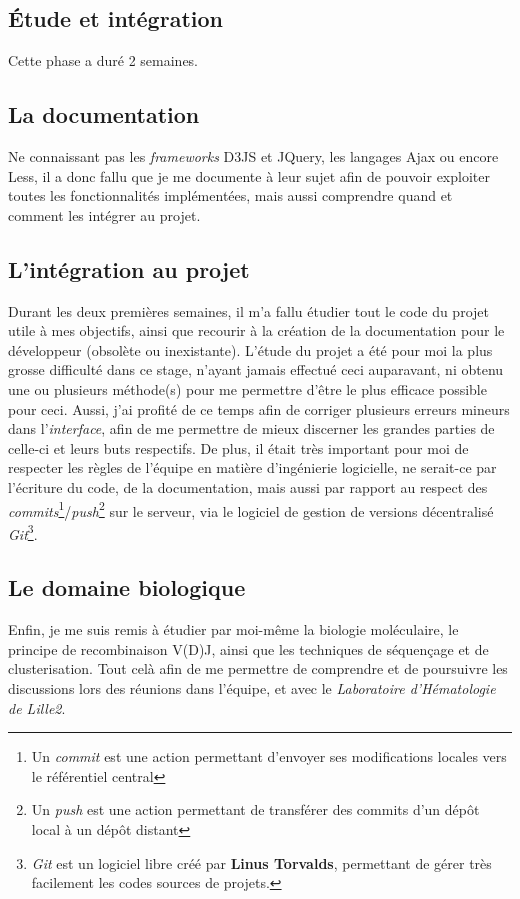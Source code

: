 \documentclass[pdftex,12pt,a4paper]{report}
\begin{document}
\begin{spacing}{1.2}
\section{Étude et intégration}

Cette phase a duré 2 semaines.

\subsection{La documentation}
Ne connaissant pas les \textit{frameworks} D3JS et JQuery, les langages Ajax ou encore Less, il a donc fallu que je me documente à leur sujet afin de pouvoir exploiter toutes les fonctionnalités implémentées, mais aussi comprendre quand et comment les intégrer au projet.

\subsection{L'intégration au projet}
Durant les deux premières semaines, il m'a fallu étudier tout le code du projet utile à mes objectifs, ainsi que recourir à la création de la documentation pour le développeur (obsolète ou inexistante). L'étude du projet a été pour moi la plus grosse difficulté dans ce stage, n'ayant jamais effectué ceci auparavant, ni obtenu une ou plusieurs méthode(s) pour me permettre d'être le plus efficace possible pour ceci. Aussi, j'ai profité de ce temps afin de corriger plusieurs erreurs mineurs dans l'\textit{interface}, afin de me permettre de mieux discerner les grandes parties de celle-ci et leurs buts respectifs.
\newline
De plus, il était très important pour moi de respecter les règles de l'équipe en matière d'ingénierie logicielle, ne serait-ce par l'écriture du code, de la documentation, mais aussi par rapport au respect des \textit{commits}\footnote{Un \textit{commit} est une action permettant d'envoyer ses modifications locales vers le référentiel central}/\textit{push}\footnote{Un \textit{push} est une action permettant de transférer des commits d'un dépôt local à un dépôt distant} sur le serveur, via le logiciel de gestion de versions décentralisé \textit{Git}\footnote{\textit{Git} est un logiciel libre créé par \textbf{Linus Torvalds}, permettant de gérer très facilement les codes sources de projets.}.

\subsection{Le domaine biologique}
Enfin, je me suis remis à étudier par moi-même la biologie moléculaire, le principe de recombinaison V(D)J, ainsi que les techniques de séquençage et de clusterisation. Tout celà afin de me permettre de comprendre et de poursuivre les discussions lors des réunions dans l'équipe, et avec le \textit{Laboratoire d'Hématologie de Lille2}.


\end{spacing}
\end{document}
